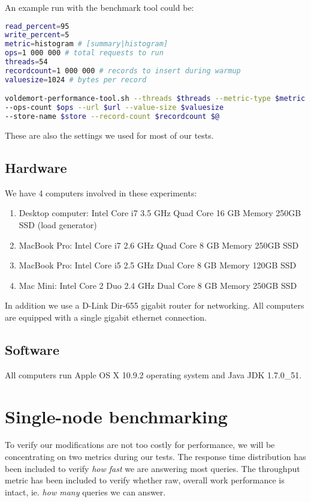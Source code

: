 An example run with the benchmark tool could be:
\begin{lstlisting}[language=bash]
read_percent=95
write_percent=5
metric=histogram # [summary|histogram]
ops=1 000 000 # total requests to run
threads=54
recordcount=1 000 000 # records to insert during warmup
valuesize=1024 # bytes per record

voldemort-performance-tool.sh --threads $threads --metric-type $metric 
--ops-count $ops --url $url --value-size $valuesize 
--store-name $store --record-count $recordcount $@
\end{lstlisting}

These are also the settings we used for most of our tests.

\subsection{Hardware}
We have 4 computers involved in these experiments:

\begin{enumerate}
	\item Desktop computer: Intel Core i7 3.5 GHz Quad Core  16 GB Memory 250GB SSD (load generator)
	\item MacBook Pro: Intel Core i7 2.6 GHz Quad Core 8 GB Memory 250GB SSD
	\item MacBook Pro: Intel Core i5 2.5 GHz Dual Core 8 GB Memory 120GB SSD
	\item Mac Mini: Intel Core 2 Duo 2.4 GHz Dual Core 8 GB Memory 250GB SSD
\end{enumerate}

In addition we use a D-Link Dir-655 gigabit router for networking. All computers are equipped with a single gigabit ethernet connection.

\subsection{Software}
All computers run Apple OS X 10.9.2 operating system and Java JDK 1.7.0\_51. 

\section{Single-node benchmarking}
To verify our modifications are not too costly for performance, we will be concentrating on two metrics during our tests. The response time distribution has been included to verify \emph{how fast} we are answering most queries. The throughput metric has been included to verify whether raw, overall work performance is intact, ie. \emph{how many} queries we can answer.

